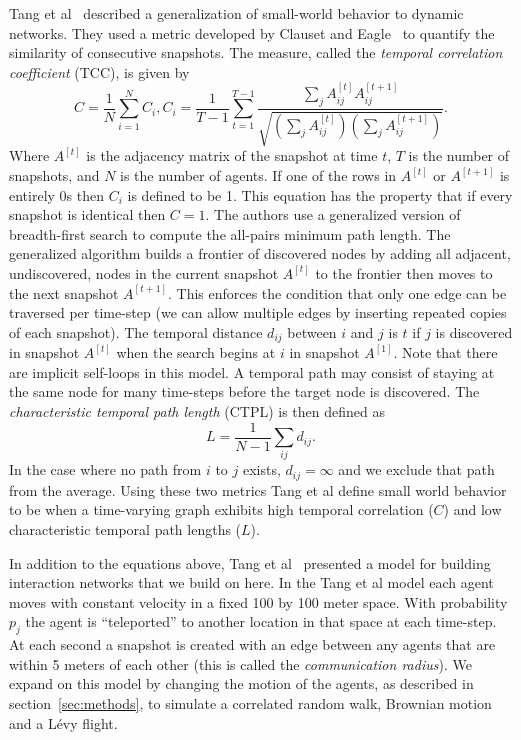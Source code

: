 \documentclass[conference]{IEEEtran}
\newcommand{\adj}[1]{A^{[#1]}}
\begin{document}
Tang et al~\cite{Tang2010} described a generalization of small-world
behavior to dynamic networks. They used a metric developed by Clauset
and Eagle~\cite{Clauset2007} to quantify the similarity of consecutive
snapshots. The measure, called the \emph{temporal correlation
  coefficient} (TCC), is given by
\begin{equation}
  C = \frac{1}{N}\sum_{i = 1}^N C_i, C_i = \frac{1}{T-1}\sum_{t=1}^{T-1} \frac{\sum_j A_{ij}^{[t]}A_{ij}^{[t+1]}}{\sqrt{(\sum_j A_{ij}^{[t]})(\sum_j A_{ij}^{[t+1]})}}.
  \label{eq:tcc}
\end{equation}
Where $\adj{t}$ is the adjacency matrix of the snapshot at time $t$,
$T$ is the number of snapshots, and $N$ is the number of agents. If
one of the rows in $\adj{t}$ or $\adj{t+1}$ is entirely 0s then $C_i$
is defined to be 1. This equation has the property that if every
snapshot is identical then $C = 1$. The authors use a generalized
version of breadth-first search to compute the all-pairs minimum path
length. The generalized algorithm builds a frontier of discovered
nodes by adding all adjacent, undiscovered, nodes in the current
snapshot $\adj{t}$ to the frontier then moves to the next snapshot
$\adj{t+1}$. This enforces the condition that only one edge can be
traversed per time-step (we can allow multiple edges by inserting
repeated copies of each snapshot). The temporal distance $d_{ij}$
between $i$ and $j$ is $t$ if $j$ is discovered in snapshot $\adj{t}$
when the search begins at $i$ in snapshot $\adj{1}$. Note that there
are implicit self-loops in this model. A temporal path may consist of
staying at the same node for many time-steps before the target node is
discovered. The \emph{characteristic temporal path length} (CTPL) is
then defined as
\begin{equation}
  L = \frac{1}{N-1} \sum_{ij}d_{ij}.
  \label{eq:ctpl}
\end{equation}
In the case
where no path from $i$ to $j$ exists, $d_{ij} = \infty$ and we exclude
that path from the average. Using these two metrics Tang et al define
small world behavior to be when a time-varying graph exhibits high
temporal correlation ($C$) and low characteristic temporal path
lengths ($L$).

In addition to the equations above, Tang et al~\cite{Tang2010}
presented a model for building interaction networks that we build on
here. In the Tang et al model each agent moves with constant velocity
in a fixed 100 by 100 meter space. With probability $p_j$ the agent is
``teleported'' to another location in that space at each time-step. At
each second a snapshot is created with an edge between any agents that
are within 5 meters of each other (this is called the
\emph{communication radius}). We expand on this model by changing the
motion of the agents, as described in section~\ref{sec:methods}, to
simulate a correlated random walk, Brownian motion and a L\'evy
flight.
\end{document}
